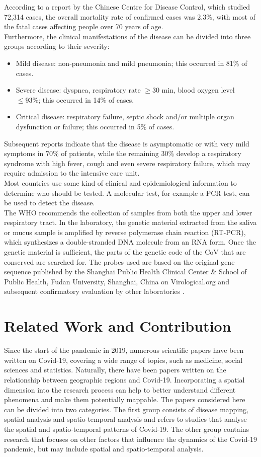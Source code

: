 According to a report by the Chinese Centre for Disease Control, which studied 72,314 cases, the overall mortality rate of confirmed cases was 2.3\%, with most of the fatal cases affecting people over 70 years of age. \\
Furthermore, the clinical manifestations of the disease can be divided into three groups according to their severity:
\begin{itemize}
    \item Mild disease: non-pneumonia and mild pneumonia; this occurred in 81\% of cases.
    \item Severe disease: dyspnea, respiratory rate $\geq 30$ min, blood oxygen level $\leq 93\%$; this occurred in 14\% of cases.
    \item Critical disease: respiratory failure, septic shock and/or multiple organ dysfunction or failure; this occurred in 5\% of cases.
\end{itemize}
Subsequent reports indicate that the disease is asymptomatic or with very mild symptoms in 70\% of patients, while the remaining 30\% develop a respiratory syndrome with high fever, cough and even severe respiratory failure, which may require admission to the intensive care unit. \\
Most countries use some kind of clinical and epidemiological information to determine who should be tested. A molecular test, for example a PCR test, can be used to detect the disease.\\
The WHO recommends the collection of samples from both the upper and lower respiratory tract. In the laboratory, the genetic material extracted from the saliva or mucus sample is amplified by reverse polymerase chain reaction (RT-PCR), which synthesizes a double-stranded DNA molecule from an RNA form. Once the genetic material is sufficient, the parts of the genetic code of the CoV that are conserved are searched for. The probes used are based on the original gene sequence published by the Shanghai Public Health Clinical Center \& School of Public Health, Fudan University, Shanghai, China on Virological.org and subsequent confirmatory evaluation by other laboratories \autocite[][]{cascella2021features}.
\clearpage
\section{Related Work and Contribution}
Since the start of the pandemic in 2019, numerous scientific papers have been written on Covid-19, covering a wide range of topics, such as medicine, social sciences and statistics. Naturally, there have been papers written on the relationship between geographic regions and Covid-19. Incorporating a spatial dimension into the research process can help to better understand different phenomena and make them potentially mappable. The papers considered here can be divided into two categories. The first group consists of disease mapping, spatial analysis and spatio-temporal analysis and refers to studies that analyse the spatial and spatio-temporal patterns of Covid-19. The other group contains research that focuses on other factors that influence the dynamics of the Covid-19 pandemic, but may include spatial and spatio-temporal analysis.
